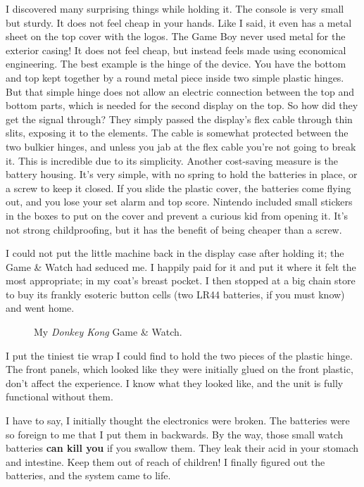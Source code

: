 \documentclass{book}
\begin{document}
I discovered many surprising things while holding it. The console is very small but sturdy. It does not feel cheap in your hands. Like I said, it even has a metal sheet on the top cover with the logos. The Game Boy never used metal for the exterior casing! It does not feel cheap, but instead feels made using economical engineering. The best example is the hinge of the device. You have the bottom and top kept together by a round metal piece inside two simple plastic hinges. But that simple hinge does not allow an electric connection between the top and bottom parts, which is needed for the second display on the top. So how did they get the signal through? They simply passed the display’s flex cable through thin slits, exposing it to the elements. The cable is somewhat protected between the two bulkier hinges, and unless you jab at the flex cable you’re not going to break it. This is incredible due to its simplicity. Another cost-saving measure is the battery housing. It’s very simple, with no spring to hold the batteries in place, or a screw to keep it closed. If you slide the plastic cover, the batteries come flying out, and you lose your set alarm and top score. Nintendo included small stickers in the boxes to put on the cover and prevent a curious kid from opening it. It’s not strong childproofing, but it has the benefit of being cheaper than a screw.\par
I could not put the little machine back in the display case after holding it; the Game \& Watch had seduced me. I happily paid for it and put it where it felt the most appropriate; in my coat’s breast pocket. I then stopped at a big chain store to buy its frankly esoteric button cells (two LR44 batteries, if you must know) and went home.\par
\FloatBarrier\vspace{\baselineskip}\begin{figure}[H]\caption*{My \emph{Donkey Kong} Game \& Watch.}\end{figure}
I put the tiniest tie wrap I could find to hold the two pieces of the plastic hinge. The front panels, which looked like they were initially glued on the front plastic, don’t affect the experience. I know what they looked like, and the unit is fully functional without them.\par
I have to say, I initially thought the electronics were broken. The batteries were so foreign to me that I put them in backwards. By the way, those small watch batteries \textbf{can kill you} if you swallow them. They leak their acid in your stomach and intestine. Keep them out of reach of children! I finally figured out the batteries, and the system came to life.\par
\end{document}
